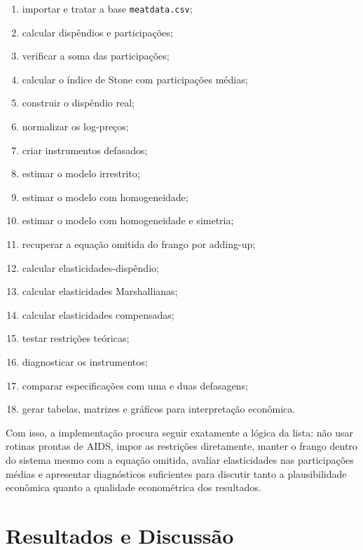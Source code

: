 \documentclass[12pt,a4paper]{article}
\begin{document}
\begin{enumerate}[label=(\roman*)]
    \item importar e tratar a base \texttt{meatdata.csv};
    \item calcular dispêndios e participações;
    \item verificar a soma das participações;
    \item calcular o índice de Stone com participações médias;
    \item construir o dispêndio real;
    \item normalizar os log-preços;
    \item criar instrumentos defasados;
    \item estimar o modelo irrestrito;
    \item estimar o modelo com homogeneidade;
    \item estimar o modelo com homogeneidade e simetria;
    \item recuperar a equação omitida do frango por adding-up;
    \item calcular elasticidades-dispêndio;
    \item calcular elasticidades Marshallianas;
    \item calcular elasticidades compensadas;
    \item testar restrições teóricas;
    \item diagnosticar os instrumentos;
    \item comparar especificações com uma e duas defasagens;
    \item gerar tabelas, matrizes e gráficos para interpretação econômica.
\end{enumerate}

Com isso, a implementação procura seguir exatamente a lógica da lista: não usar rotinas prontas de AIDS, impor as restrições diretamente, manter o frango dentro do sistema mesmo com a equação omitida, avaliar elasticidades nas participações médias e apresentar diagnósticos suficientes para discutir tanto a plausibilidade econômica quanto a qualidade econométrica dos resultados.



\section{Resultados e Discussão}
\end{document}
